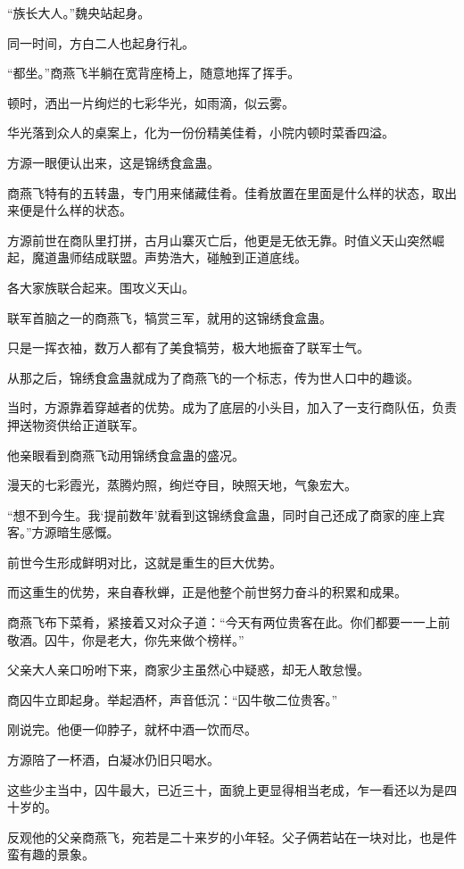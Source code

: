 \begin{this_body}
“族长大人。”魏央站起身。

同一时间，方白二人也起身行礼。

“都坐。”商燕飞半躺在宽背座椅上，随意地挥了挥手。

顿时，洒出一片绚烂的七彩华光，如雨滴，似云雾。

华光落到众人的桌案上，化为一份份精美佳肴，小院内顿时菜香四溢。

方源一眼便认出来，这是锦绣食盒蛊。

商燕飞特有的五转蛊，专门用来储藏佳肴。佳肴放置在里面是什么样的状态，取出来便是什么样的状态。

方源前世在商队里打拼，古月山寨灭亡后，他更是无依无靠。时值义天山突然崛起，魔道蛊师结成联盟。声势浩大，碰触到正道底线。

各大家族联合起来。围攻义天山。

联军首脑之一的商燕飞，犒赏三军，就用的这锦绣食盒蛊。

只是一挥衣袖，数万人都有了美食犒劳，极大地振奋了联军士气。

从那之后，锦绣食盒蛊就成为了商燕飞的一个标志，传为世人口中的趣谈。

当时，方源靠着穿越者的优势。成为了底层的小头目，加入了一支行商队伍，负责押送物资供给正道联军。

他亲眼看到商燕飞动用锦绣食盒蛊的盛况。

漫天的七彩霞光，蒸腾灼照，绚烂夺目，映照天地，气象宏大。

“想不到今生。我‘提前数年’就看到这锦绣食盒蛊，同时自己还成了商家的座上宾客。”方源暗生感慨。

前世今生形成鲜明对比，这就是重生的巨大优势。

而这重生的优势，来自春秋蝉，正是他整个前世努力奋斗的积累和成果。

商燕飞布下菜肴，紧接着又对众子道：“今天有两位贵客在此。你们都要一一上前敬酒。囚牛，你是老大，你先来做个榜样。”

父亲大人亲口吩咐下来，商家少主虽然心中疑惑，却无人敢怠慢。

商囚牛立即起身。举起酒杯，声音低沉：“囚牛敬二位贵客。”

刚说完。他便一仰脖子，就杯中酒一饮而尽。

方源陪了一杯酒，白凝冰仍旧只喝水。

这些少主当中，囚牛最大，已近三十，面貌上更显得相当老成，乍一看还以为是四十岁的。

反观他的父亲商燕飞，宛若是二十来岁的小年轻。父子俩若站在一块对比，也是件蛮有趣的景象。


\end{this_body}

